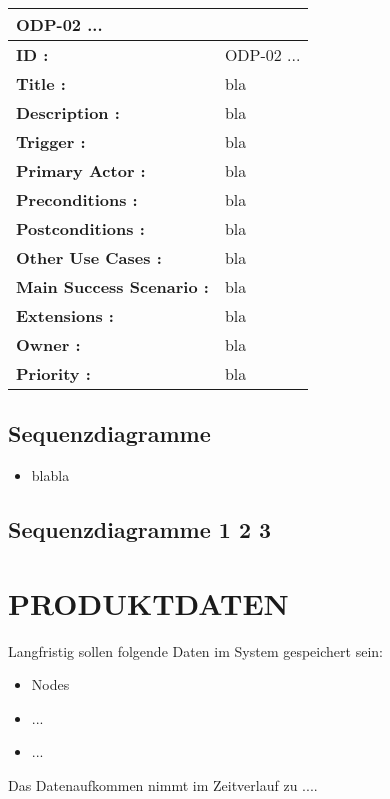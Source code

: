 	\begin{table}
		\begin{tabular}{|p{8cm}|p{8cm}|}
			\hline
			\textbf{ODP-02 ...} \\ 				\hline
			\textbf{ID :}\centering & ODP-02 ... \\ \hline 
			\textbf{Title :}\centering & bla \\ \hline 
			\textbf{Description :}\centering & bla \\ \hline 
			\textbf{Trigger :}\centering & bla \\ \hline 
			\textbf{Primary Actor :} \centering & bla \\ \hline 
			\textbf{Preconditions :}\centering & bla \\ \hline 
			\textbf{Postconditions :}\centering & bla \\ \hline
			\textbf{Other Use Cases :}\centering & bla \\ \hline  
			\textbf{Main Success Scenario :}\centering & bla \\ \hline  
			\textbf{Extensions :}\centering & bla \\ \hline  
			\textbf{Owner :}\centering & bla \\ \hline  
			\textbf{Priority :}\centering & bla \\ \hline  
		\end{tabular}
	\end{table}
	
	\subsection{Sequenzdiagramme}
	\begin{itemize}
		\item blabla
	\end{itemize}
	\subsection{Sequenzdiagramme 1 2 3}
	
	
	\section{\Large PRODUKTDATEN}
		Langfristig sollen folgende Daten im System  gespeichert sein:
	\begin{itemize}
		\item Nodes
		\item ...
		\item ...
	\end{itemize}
		Das Datenaufkommen nimmt im Zeitverlauf zu .... 
